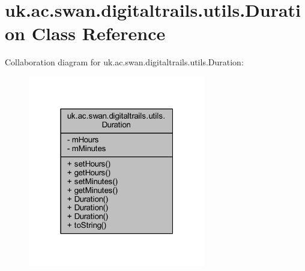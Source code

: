 \hypertarget{classuk_1_1ac_1_1swan_1_1digitaltrails_1_1utils_1_1_duration}{\section{uk.\+ac.\+swan.\+digitaltrails.\+utils.\+Duration Class Reference}
\label{classuk_1_1ac_1_1swan_1_1digitaltrails_1_1utils_1_1_duration}
}


Collaboration diagram for uk.\+ac.\+swan.\+digitaltrails.\+utils.\+Duration\+:
\nopagebreak
\begin{figure}[H]
\begin{center}
\leavevmode
\includegraphics[width=220pt]{classuk_1_1ac_1_1swan_1_1digitaltrails_1_1utils_1_1_duration__coll__graph}
\end{center}
\end{figure}
